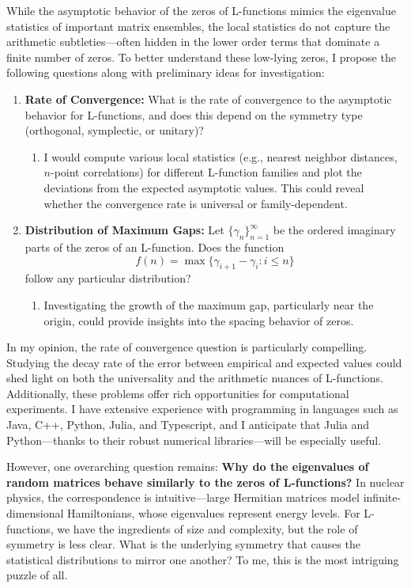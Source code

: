 \documentclass{article}
\begin{document}
While the asymptotic behavior of the zeros of L-functions mimics the eigenvalue statistics of important matrix ensembles, the local statistics do not capture the arithmetic subtleties—often hidden in the lower order terms that dominate a finite number of zeros. To better understand these low-lying zeros, I propose the following questions along with preliminary ideas for investigation:

\begin{enumerate}
    \item \textbf{Rate of Convergence:} What is the rate of convergence to the asymptotic behavior for L-functions, and does this depend on the symmetry type (orthogonal, symplectic, or unitary)? 
    \begin{enumerate}
        \item I would compute various local statistics (e.g., nearest neighbor distances, $n$-point correlations) for different L-function families and plot the deviations from the expected asymptotic values. This could reveal whether the convergence rate is universal or family-dependent.
    \end{enumerate}
    
    \item \textbf{Distribution of Maximum Gaps:} Let $\{\gamma_n\}_{n=1}^\infty$ be the ordered imaginary parts of the zeros of an L-function. Does the function 
    \[
    f(n) = \max\{ \gamma_{i+1} - \gamma_i : i \le n\}
    \]
    follow any particular distribution?
    \begin{enumerate}
        \item Investigating the growth of the maximum gap, particularly near the origin, could provide insights into the spacing behavior of zeros.
    \end{enumerate}
\end{enumerate}

In my opinion, the rate of convergence question is particularly compelling. Studying the decay rate of the error between empirical and expected values could shed light on both the universality and the arithmetic nuances of L-functions. Additionally, these problems offer rich opportunities for computational experiments. I have extensive experience with programming in languages such as Java, C++, Python, Julia, and Typescript, and I anticipate that Julia and Python—thanks to their robust numerical libraries—will be especially useful.

However, one overarching question remains: \textbf{Why do the eigenvalues of random matrices behave similarly to the zeros of L-functions?} In nuclear physics, the correspondence is intuitive—large Hermitian matrices model infinite-dimensional Hamiltonians, whose eigenvalues represent energy levels. For L-functions, we have the ingredients of size and complexity, but the role of symmetry is less clear. What is the underlying symmetry that causes the statistical distributions to mirror one another? To me, this is the most intriguing puzzle of all.
\end{document}
